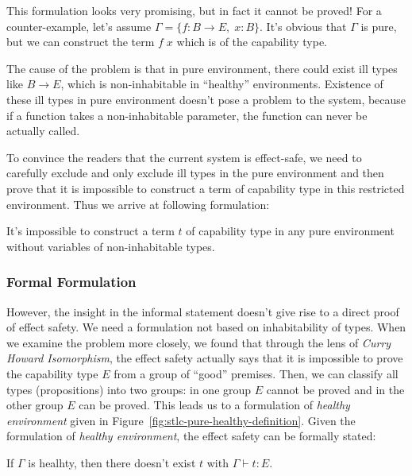 This formulation looks very promising, but in fact it cannot be proved!
For a counter-example, let's assume $\Gamma = \{f: B \to E, \; x:
B\}$. It's obvious that $\Gamma$ is pure, but we can construct the
term $f \; x$ which is of the capability type.

The cause of the problem is that in pure environment, there could exist
ill types like $B \to E$, which is non-inhabitable in ``healthy''
environments.  Existence of these ill types in pure environment
doesn't pose a problem to the system, because if a function takes a
non-inhabitable parameter, the function can never be actually called.

To convince the readers that the current system is effect-safe, we
need to carefully exclude and only exclude ill types in the pure
environment and then prove that it is impossible to construct a term
of capability type in this restricted environment. Thus we arrive at
following formulation:

\begin{definition}
  It's impossible to construct a term $t$ of capability type in any
  pure environment without variables of non-inhabitable types.
\end{definition}

\subsubsection{Formal Formulation}

However, the insight in the informal statement doesn't give rise to a
direct proof of effect safety. We need a formulation not based on
inhabitability of types. When we examine the problem more closely, we
found that through the lens of \emph{Curry Howard Isomorphism}, the
effect safety actually says that it is impossible to prove the
capability type $E$ from a group of ``good'' premises. Then, we can
classify all types (propositions) into two groups: in one group $E$
cannot be proved and in the other group $E$ can be proved. This leads
us to a formulation of \emph{healthy environment} given in
Figure~\ref{fig:stlc-pure-healthy-definition}. Given the formulation
of \emph{healthy environment}, the effect safety can be formally
stated:

\begin{definition}
  If $\Gamma$ is healhty, then there doesn't exist $t$ with
  $\Gamma \vdash t : E$.
\end{definition}

